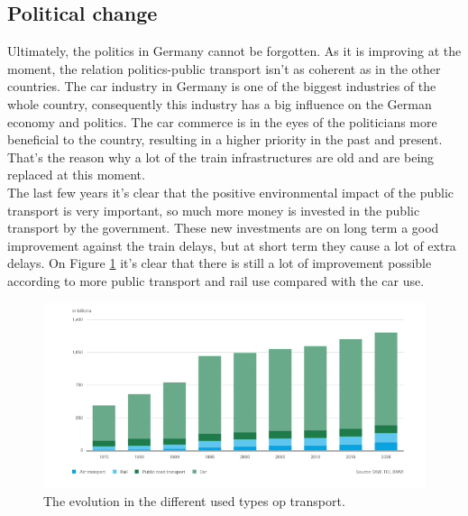 \subsection{Political change}\label{politicalChange}
Ultimately, the politics in Germany cannot be forgotten. As it is improving at the moment, the relation politics-public transport isn't as coherent as in the other countries. The car industry in Germany is one of the biggest industries of the whole country, consequently this industry has a big influence on the German economy and politics. The car commerce is in the eyes of the politicians more beneficial to the country, resulting in a higher priority in the past and present. That's the reason why a lot of the train infrastructures are old and are being replaced at this moment. \\ \newline 
The last few years it's clear that the positive environmental impact of the public transport is very important, so much more money is invested in the public transport by the government. These new investments are on long term a good improvement against the train delays, but at short term they cause a lot of extra delays. On Figure \ref{fig:typesOfTransport} it's clear that there is still a lot of improvement possible according to more public transport and rail use compared with the car use. 

\begin{figure}[h!]
	\centering
	\includegraphics[width=0.55\textheight]{ProblemsFigures/typesOfTransportGermany}
	\caption{The evolution in the different used types op transport.}
	\label{fig:typesOfTransport}
	
\end{figure}

